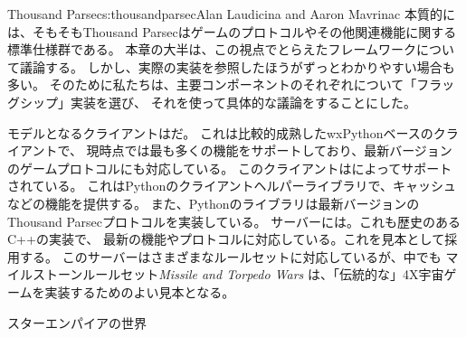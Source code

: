 \begin{aosachapter}{Thousand Parsec}{s:thousandparsec}{Alan Laudicina and Aaron Mavrinac}
本質的には、そもそもThousand Parsecはゲームのプロトコルやその他関連機能に関する標準仕様群である。
本章の大半は、この視点でとらえたフレームワークについて議論する。
しかし、実際の実装を参照したほうがずっとわかりやすい場合も多い。
そのために私たちは、主要コンポーネントのそれぞれについて「フラッグシップ」実装を選び、
それを使って具体的な議論をすることにした。

モデルとなるクライアントはだ。
これは比較的成熟したwxPythonベースのクライアントで、
現時点では最も多くの機能をサポートしており、最新バージョンのゲームプロトコルにも対応している。
このクライアントはによってサポートされている。
これはPythonのクライアントヘルパーライブラリで、キャッシュなどの機能を提供する。
また、Pythonのライブラリは最新バージョンのThousand Parsecプロトコルを実装している。
サーバーには。これも歴史のあるC++の実装で、
最新の機能やプロトコルに対応している。これを見本として採用する。
このサーバーはさまざまなルールセットに対応しているが、中でも
マイルストーンルールセット\emph{Missile and Torpedo Wars}
は、「伝統的な」4X宇宙ゲームを実装するためのよい見本となる。

\begin{aosasect1}{スターエンパイアの世界}


\end{aosasect1}
\end{aosachapter}
